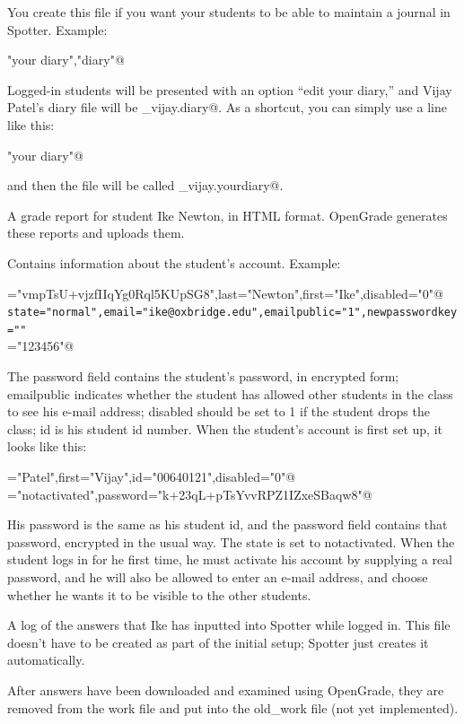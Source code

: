 \documentclass{doc}
\begin{document}
 You create this file if you want your students to be able to
maintain a journal in Spotter. Example:

\verb@"your diary","diary"@

\noindent Logged-in students will be presented with an option ``edit your diary,''
and Vijay Patel's diary file will be \verb@patel_vijay.diary@.
As a shortcut, you can simply use a line like this:

\verb@"your diary"@

\noindent and then the file will be called \verb@patel_vijay.yourdiary@.

 A grade report for student Ike Newton, in HTML
format. OpenGrade generates these reports and uploads them.

 Contains information about the student's account.
Example:

\verb@password="vmpTsU+vjzfIIqYg0Rql5KUpSG8",last="Newton",first="Ike",disabled="0"@\\
\verb|state="normal",email="ike@oxbridge.edu",emailpublic="1",newpasswordkey=""|\\
\verb@id="123456"@

The password field contains the student's password, in encrypted form; emailpublic
indicates whether the student has allowed other students in the class to see his
e-mail address; disabled should be set to 1 if the student drops the class; id
is his student id number. When the student's account is first set up, it looks like
this:

\verb@last="Patel",first="Vijay",id="00640121",disabled="0"@\\
\verb@state="notactivated",password="k+23qL+pTsYvvRPZ1IZxeSBaqw8"@

His password is the same as his student id, and the password field contains that
password, encrypted in the usual way. The state is set to notactivated. When the
student logs in for he first time, he must activate his account by supplying a
real password, and he will also be allowed to enter an e-mail address, and choose
whether he wants it to be visible to the other students.

 A log of the answers that Ike has inputted into Spotter
while logged in. This file doesn't have to be created as part of the initial setup; Spotter just creates it automatically.

 After answers have been downloaded and examined using OpenGrade,
they are removed from the work file and put into the old\_work file (not yet
implemented).
\end{document}
